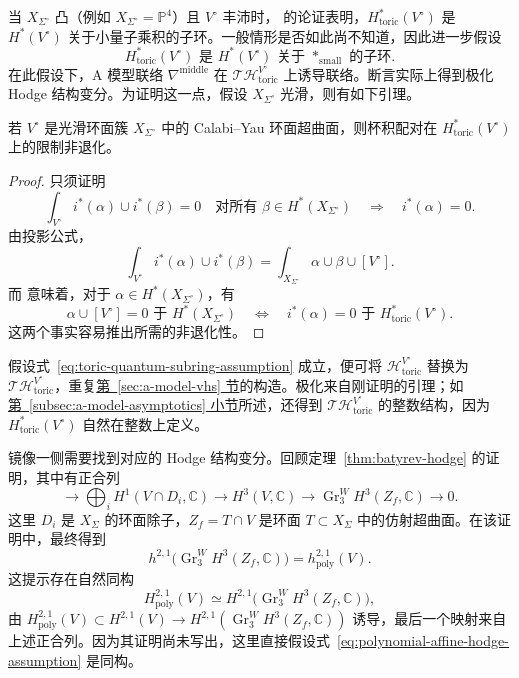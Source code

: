 当 $X_{\Sigma^\circ}$ 凸（例如 $X_{\Sigma^\circ}=\mathbb P^4$）且 $V^\circ$ 丰沛时， 的论证表明，$H^*_{\mathrm{toric}}(V^\circ)$ 是 $H^*(V^\circ)$ 关于小量子乘积的子环。一般情形是否如此尚不知道，因此进一步假设
\begin{equation}\label{eq:toric-quantum-subring-assumption}
H^*_{\mathrm{toric}}(V^\circ)\text{ 是 }H^*(V^\circ)\text{ 关于 }*_{\mathrm{small}}\text{ 的子环}.
\end{equation}
在此假设下，A 模型联络 $\nabla^{\mathrm{middle}}$ 在 $\mathcal T\mathcal H^{V^\circ}_{\mathrm{toric}}$ 上诱导联络。断言实际上得到极化 Hodge 结构变分。为证明这一点，假设 $X_{\Sigma^\circ}$ 光滑，则有如下引理。
\begin{lemma}\label{lem:toric-cohomology-pairing-nondegenerate}
若 $V^\circ$ 是光滑环面簇 $X_{\Sigma^\circ}$ 中的 Calabi--Yau 环面超曲面，则杯积配对在 $H^*_{\mathrm{toric}}(V^\circ)$ 上的限制非退化。
\end{lemma}
\begin{proof}
只须证明
\[
\int_{V^\circ}i^*(\alpha)\cup i^*(\beta)=0\quad\text{对所有 }\beta\in H^*(X_{\Sigma^\circ})
\quad\Longrightarrow\quad i^*(\alpha)=0.
\]
由投影公式，
\[
\int_{V^\circ}i^*(\alpha)\cup i^*(\beta)=\int_{X_{\Sigma^\circ}}\alpha\cup\beta\cup[V^\circ].
\]
而  意味着，对于 $\alpha\in H^*(X_{\Sigma^\circ})$，有
\[
\alpha\cup[V^\circ]=0\text{ 于 }H^*(X_{\Sigma^\circ})
\quad\Longleftrightarrow\quad
 i^*(\alpha)=0\text{ 于 }H^*_{\mathrm{toric}}(V^\circ).
\]
这两个事实容易推出所需的非退化性。
\end{proof}
假设式~\eqref{eq:toric-quantum-subring-assumption} 成立，便可将 $\mathcal H^{V^\circ}_{\mathrm{toric}}$ 替换为 $\mathcal T\mathcal H^{V^\circ}_{\mathrm{toric}}$，重复\hyperref[sec:a-model-vhs]{第~\ref*{sec:a-model-vhs} 节}的构造。极化来自刚证明的引理；如\hyperref[subsec:a-model-asymptotics]{第~\ref*{subsec:a-model-asymptotics} 小节}所述，还得到 $\mathcal T\mathcal H^{V^\circ}_{\mathrm{toric}}$ 的整数结构，因为 $H^*_{\mathrm{toric}}(V^\circ)$ 自然在整数上定义。

镜像一侧需要找到对应的 Hodge 结构变分。回顾定理~\ref{thm:batyrev-hodge} 的证明，其中有正合列
\[
\longrightarrow\bigoplus_iH^1(V\cap D_i,\mathbb C)\longrightarrow H^3(V,\mathbb C)
\longrightarrow\operatorname{Gr}^W_3H^3(Z_f,\mathbb C)\longrightarrow0.
\]
这里 $D_i$ 是 $X_\Sigma$ 的环面除子，$Z_f=T\cap V$ 是环面 $T\subset X_\Sigma$ 中的仿射超曲面。在该证明中，最终得到
\[
h^{2,1}\bigl(\operatorname{Gr}^W_3H^3(Z_f,\mathbb C)\bigr)=h^{2,1}_{\mathrm{poly}}(V).
\]
这提示存在自然同构
\begin{equation}\label{eq:polynomial-affine-hodge-assumption}
H^{2,1}_{\mathrm{poly}}(V)\simeq H^{2,1}\bigl(\operatorname{Gr}^W_3H^3(Z_f,\mathbb C)\bigr),
\end{equation}
由 $H^{2,1}_{\mathrm{poly}}(V)\subset H^{2,1}(V)\to H^{2,1}(\operatorname{Gr}^W_3H^3(Z_f,\mathbb C))$ 诱导，最后一个映射来自上述正合列。因为其证明尚未写出，这里直接假设式~\eqref{eq:polynomial-affine-hodge-assumption} 是同构。

